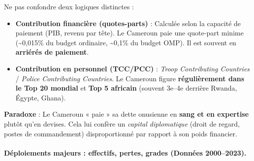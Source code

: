 \documentclass[11pt]{article}
\begin{document}
\begin{attention}
Ne pas confondre deux logiques distinctes :
\begin{itemize}
    \item \textbf{Contribution financière (quotes-parts)} : Calculée selon la capacité de paiement (PIB, revenu par tête). Le Cameroun paie une quote-part minime (\textasciitilde 0,015\% du budget ordinaire, \textasciitilde 0,1\% du budget OMP). Il est souvent en \textbf{arriérés de paiement}.
    \item \textbf{Contribution en personnel (TCC/PCC)} : \emph{Troop Contributing Countries} / \emph{Police Contributing Countries}. Le Cameroun figure \textbf{régulièrement dans le Top 20 mondial} et \textbf{Top 5 africain} (souvent 3e--4e derrière Rwanda, Égypte, Ghana).
\end{itemize}
\textbf{Paradoxe} : Le Cameroun « paie » sa dette onusienne en \textbf{sang et en expertise} plutôt qu'en devises. Cela lui confère un \emph{capital diplomatique} (droit de regard, postes de commandement) disproportionné par rapport à son poids financier.
\end{attention}

\paragraph{Déploiements majeurs : effectifs, pertes, grades (Données 2000--2023).}
\end{document}
